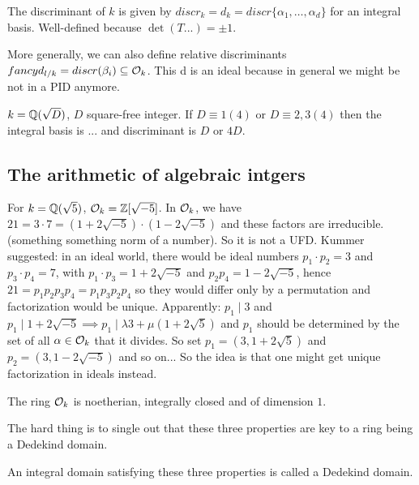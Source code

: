 \begin{outline}
    \begin{definition}
        The discriminant of $k$ is given by $discr_k=d_k=discr\{ \alpha_1, \ldots, \alpha_d \}$ for an integral basis. Well-defined because $\det(T...)=\pm 1$.
    \end{definition}
    
    More generally, we can also define relative discriminants $ fancy d_{l/k} = discr(\beta_i)\subseteq \mathcal{O}_k$. This d is an ideal because in general we might be not in a PID anymore. 
    
    \begin{exercise}
        $k=\mathbb{Q}(\sqrt{D})$, $D$ square-free integer. If $D \equiv 1 (4)$ or $D \equiv 2,3 (4)$  then the integral basis is ... and discriminant is $D$ or $4D$.
    \end{exercise}
\end{outline}

\subsection{The arithmetic of algebraic intgers}

\begin{outline}
\0 For $k=\mathbb{Q}(\sqrt{5})$, $\mathcal{O}_k = \mathbb{Z}[\sqrt{-5}]$. In $\mathcal{O}_k$, we have $21=3\cdot 7 = (1+2\sqrt{-5})\cdot (1-2\sqrt{-5})$ and these factors are irreducible. (something something norm of a number). So it is not a UFD. Kummer suggested: in an ideal world, there would be ideal numbers $p_1\cdot p_2 = 3$ and $p_3\cdot p_4 = 7$, with $p_1\cdot p_3 = 1+2\sqrt{-5}$ and $p_2 p_4 = 1-2\sqrt{-5}$, hence $21 = p_1p_2p_3p_4=p_1p_3p_2p_4$ so they would differ only by a permutation and factorization would be unique. Apparently: $p_1 \mid 3$ and $p_1 \mid 1+2\sqrt{-5} \implies p_1 \mid \lambda 3 + \mu (1+2\sqrt{5})$ and $p_1$ should be determined by the set of all $\alpha \in \mathcal{O}_k$ that it divides.  So set $p_1=(3,1+2\sqrt{5})$ and $p_2=(3,1-2\sqrt{-5})$ and so on... So the idea is that one might get unique factorization in ideals instead. 

\begin{theorem}
    The ring $\mathcal{O}_k$ is noetherian, integrally closed and of dimension $1$.
\end{theorem}

The hard thing is to single out that these three properties are key to a ring being a Dedekind domain. 

\begin{definition}
An integral domain satisfying these three properties is called a Dedekind domain. 
\end{definition}
\end{outline}


 